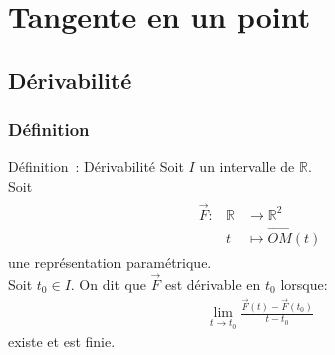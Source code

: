 \documentclass[14pt]{beamer}
\begin{document}
\section{Tangente en un point}
\subsection{Dérivabilité}
\subsubsection{Définition}
\begin{frame}
        \begin{alertblock}{Définition~: Dérivabilité}
                Soit $I$ un intervalle de $\mathbb{R}$.\\
                Soit 
                \begin{align*}
                        \begin{array}{lll}
                        \vec{F}: & \mathbb{R} &\to \mathbb{R}^2\\
                        & t &\mapsto \overrightarrow{OM}(t)
                \end{array}
                \end{align*}
                une représentation paramétrique.\\
                Soit $t_0\in I$.
                On dit que $\vec{F}$ est dérivable en $t_0$ lorsque:
                \begin{align*}
                        \lim_{t\to t_0}\frac{\vec{F}(t)-\vec{F}(t_0)}{t-t_0}
                \end{align*}
                existe et est finie.
        \end{alertblock}
\end{frame}
\end{document}
